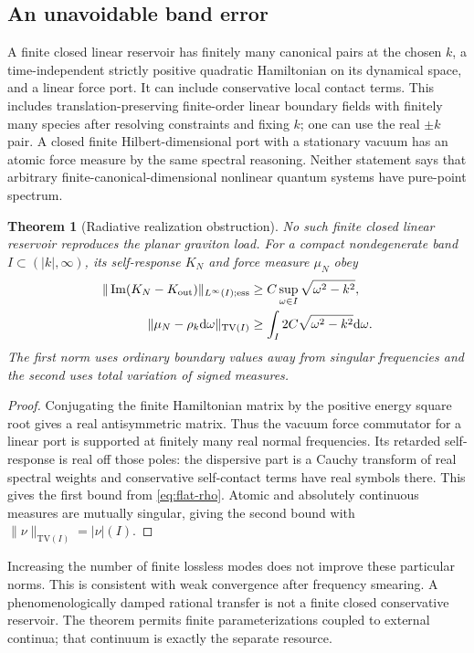 \documentclass[11pt]{article}
\newtheorem{theorem}{Theorem}[section]
\newcommand{\dd}{\mathrm d}
\newcommand{\TV}{\mathrm{TV}}
\begin{document}
\subsection{An unavoidable band error}
A finite closed linear reservoir has finitely many canonical pairs at the chosen \(k\), a time-independent strictly positive quadratic Hamiltonian on its dynamical space, and a linear force port. It can include conservative local contact terms. This includes translation-preserving finite-order linear boundary fields with finitely many species after resolving constraints and fixing \(k\); one can use the real \(\pm k\) pair. A closed finite Hilbert-dimensional port with a stationary vacuum has an atomic force measure by the same spectral reasoning. Neither statement says that arbitrary finite-canonical-dimensional nonlinear quantum systems have pure-point spectrum.

\begin{theorem}[Radiative realization obstruction]\label{thm:bounds}
No such finite closed linear reservoir reproduces the planar graviton load. For a compact nondegenerate band \(I\subset(|k|,\infty)\), its self-response \(K_N\) and force measure \(\mu_N\) obey
\begin{align}
 \|\operatorname{Im}(K_N-K_{\rm out})\|_{L^\infty(I);{\rm ess}}
 &\ge C\sup_{\omega\in I}\sqrt{\omega^2-k^2},\\
 \|\mu_N-\rho_k\dd\omega\|_{\TV(I)}
 &\ge \int_I2C\sqrt{\omega^2-k^2}\dd\omega .
\end{align}
The first norm uses ordinary boundary values away from singular frequencies and the second uses total variation of signed measures.
\end{theorem}
\begin{proof}
Conjugating the finite Hamiltonian matrix by the positive energy square root gives a real antisymmetric matrix. Thus the vacuum force commutator for a linear port is supported at finitely many real normal frequencies. Its retarded self-response is real off those poles: the dispersive part is a Cauchy transform of real spectral weights and conservative self-contact terms have real symbols there. This gives the first bound from \eqref{eq:flat-rho}. Atomic and absolutely continuous measures are mutually singular, giving the second bound with \(\|\nu\|_{\TV(I)}=|\nu|(I)\).
\end{proof}

Increasing the number of finite lossless modes does not improve these particular norms. This is consistent with weak convergence after frequency smearing. A phenomenologically damped rational transfer is not a finite closed conservative reservoir. The theorem permits finite parameterizations coupled to external continua; that continuum is exactly the separate resource.
\end{document}
